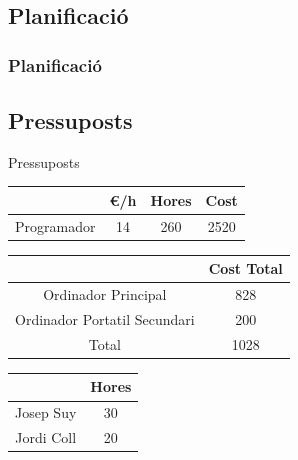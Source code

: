 \documentclass[13pt]{beamer}
\begin{document}
  \subsection{Planificació}
  \begin{frame}
    \frametitle{Planificació}

  \end{frame}

  \subsection{Pressuposts}
  \begin{frame}{Pressuposts}
    \begin{center}
      \begin{tabular}{|| c | c | c | c||} 
      \hline
       & \euro/h & Hores & Cost \\ [0.5ex] 
      \hline\hline
      Programador & 14 & 260 & 2520 \\ [1ex] 
      \hline
     \end{tabular}
     \end{center}
  
     \begin{center}
      \begin{tabular}{|| c | c |} 
      \hline
       & Cost Total \\ [0.5ex] 
      \hline\hline
      Ordinador Principal & 828  \\ [1ex] 
      Ordinador Portatil Secundari & 200 \\ [1ex] 
      \hline\hline
      Total & 1028 \\
      \hline
     \end{tabular}
     \end{center}
  
     \begin{center}
      \begin{tabular}{|| c | c ||} 
      \hline
       & Hores \\ [0.5ex] 
      \hline\hline
      Josep Suy & 30 \\ [1ex] 
      Jordi Coll & 20 \\ [1ex] 
      \hline
     \end{tabular}
     \end{center}
  \end{frame}
\end{document}
